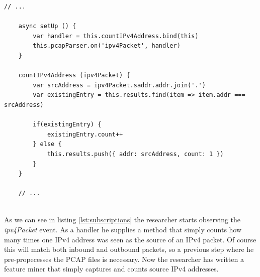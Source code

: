 \begin{lstlisting}[caption={Creating a subscription and mining source addresses},float=H,label={lst:subscriptions}]
    // ...
    
    async setUp () {
        var handler = this.countIPv4Address.bind(this)
        this.pcapParser.on('ipv4Packet', handler)
    }

    countIPv4Address (ipv4Packet) {
        var srcAddress = ipv4Packet.saddr.addr.join('.')
        var existingEntry = this.results.find(item => item.addr === srcAddress)

        if(existingEntry) {
            existingEntry.count++
        } else {
            this.results.push({ addr: srcAddress, count: 1 })
        }
    }
    
    // ...
 

\end{lstlisting}
As we can see in listing \ref{lst:subscriptions} the researcher starts observing the \textit{ipv4Packet} event. As a handler he supplies a method that simply counts how many times one IPv4 address was seen as the source of an IPv4 packet. Of course this will match both inbound and outbound packets, so a previous step where he pre-propecesses the PCAP files is necessary.
Now the researcher has written a feature miner that simply captures and counts source IPv4 addresses.

